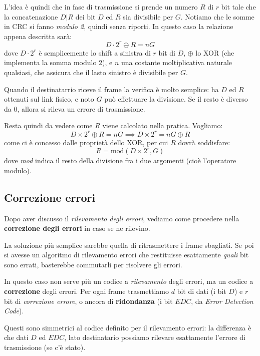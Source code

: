 \documentclass[a4paper,11pt]{article}
\begin{document}
\begin{itemize}
		L'idea è quindi che in fase di trasmissione si prende un numero $R$ di $r$ bit tale che la concatenazione $D|R$ dei bit $D$ ed $R$ sia divisibile per $G$.
		Notiamo che le somme in CRC si fanno \textit{modulo 2}, quindi senza riporti.
		In questo caso la relazione appena descritta sarà:
		$$
		D \cdot 2^r \oplus R = nG
		$$
		dove $D \cdot 2^r$ è semplicemente lo shift a sinistra di $r$ bit di $D$, $\oplus$ lo XOR (che implementa la somma modulo 2), e $n$ una costante moltiplicativa naturale qualsiasi, che assicura che il lasto sinistro è divisibile per $G$.

		Quando il destinatarrio riceve il frame la verifica è molto semplice: ha $D$ ed $R$ ottenuti sul link fisico, e noto $G$ può effettuare la divisione. Se il resto è diverso da 0, allora si rileva un errore di trasmissione.

		Resta quindi da vedere come $R$ viene calcolato nella pratica.
		Vogliamo:
		$$
		D \times 2^r \oplus R = n G \implies D \times 2^r = n G \oplus R
		$$
		come ci è concesso dalle proprietà dello XOR, per cui $R$ dovrà soddisfare:
		$$
		R = \text{mod}\left( D \times 2^r, G \right)
		$$
		dove \textit{mod} indica il resto della divisione fra i due argomenti (cioè l'operatore modulo).
\end{itemize}

\subsection{Correzione errori}
Dopo aver discusso il \textit{rilevamento degli errori}, vediamo come procedere nella \textbf{correzione degli errori} in caso se ne rilevino.

La soluzione più semplice sarebbe quella di ritrasmettere i frame sbagliati.
Se poi si avesse un algoritmo di rilevamento errori che restituisse esattamente \textit{quali} bit sono errati, basterebbe commutarli per risolvere gli errori.

In questo caso non serve più un codice a \textit{rilevamento} degli errori, ma un codice a \textbf{correzione} degli errori.
Per ogni frame  trasmettiamo $d$ bit di dati (i bit $D$) e $r$ bit di \textit{correzione errore}, o ancora di \textbf{ridondanza} (i bit $EDC$, da \textit{Error Detection Code}).

Questi sono simmetrici al codice definito per il rilevamento errori: la differenza è che dati $D$ ed $EDC$, lato destinatario possiamo rilevare esattamente l'errore di trasmissione (se c'è stato).
\end{document}
